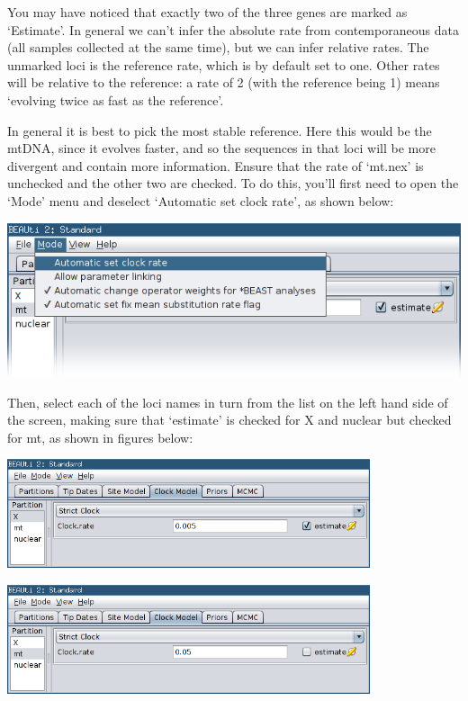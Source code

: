 \documentclass[a4paper,11pt]{article}
\begin{document}
You may have noticed that exactly two of the three genes are marked as
`Estimate'. In general we can't infer the absolute rate from contemporaneous
data (all samples collected at the same time), but we can infer relative rates.
The unmarked loci is the reference rate, which is by default set to one. Other
rates will be relative to the reference: a rate of 2 (with the reference being
1) means `evolving twice as fast as the reference'.

In general it is best to pick the most stable reference. Here this would be the
mtDNA, since it evolves faster, and so the sequences in that loci will be more
divergent and contain more information. Ensure that the rate of `mt.nex' is
unchecked and the other two are checked. To do this, you'll first need to open
the `Mode' menu and deselect `Automatic set clock rate', as shown below:

\includegraphics[width=\textwidth]{figures/clock_model.png}

Then, select each of the loci names in turn from the list on the left hand side
of the screen, making sure that `estimate' is checked for X and nuclear but
checked for mt, as shown in figures below:

\begin{center}
    \includegraphics[width=0.8\textwidth]{figures/clock_model2.png}
\end{center}

\begin{center}
\includegraphics[width=0.8\textwidth]{figures/clock_model3.png}
\end{center}
\end{document}
